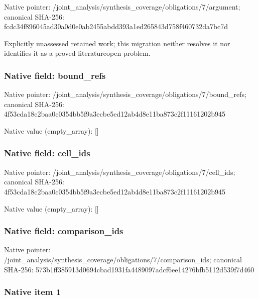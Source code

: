 \documentclass[10pt,a4paper]{article}
\begin{document}
Native pointer: /joint\_analysis/synthesi\allowbreak{}s\_coverage/obligations/7\allowbreak{}/argument; canonical SHA-256: fcdc34f896045ad30a0d0e0a\allowbreak{}b2455abdd393a1ed265843d7\allowbreak{}58f460732da7bc7d


Explicitly unassessed retained work; this migration neither resolves it nor identifies it as a proved literatureopen problem.


\subsubsection{Native field: bound\_refs}


Native pointer: /joint\_analysis/synthesi\allowbreak{}s\_coverage/obligations/7\allowbreak{}/bound\_refs; canonical SHA-256: 4f53cda18c2baa0c0354bb5f\allowbreak{}9a3ecbe5ed12ab4d8e11ba87\allowbreak{}3c2f11161202b945



Native value (empty\_array): []



\subsubsection{Native field: cell\_ids}


Native pointer: /joint\_analysis/synthesi\allowbreak{}s\_coverage/obligations/7\allowbreak{}/cell\_ids; canonical SHA-256: 4f53cda18c2baa0c0354bb5f\allowbreak{}9a3ecbe5ed12ab4d8e11ba87\allowbreak{}3c2f11161202b945



Native value (empty\_array): []



\subsubsection{Native field: comparison\_ids}


Native pointer: /joint\_analysis/synthesi\allowbreak{}s\_coverage/obligations/7\allowbreak{}/comparison\_ids; canonical SHA-256: 573b1ff385913d0694cbad19\allowbreak{}31fa4489097adcf6ee14276b\allowbreak{}fb5112d539f7d460



\subsubsection{Native item 1}
\end{document}
